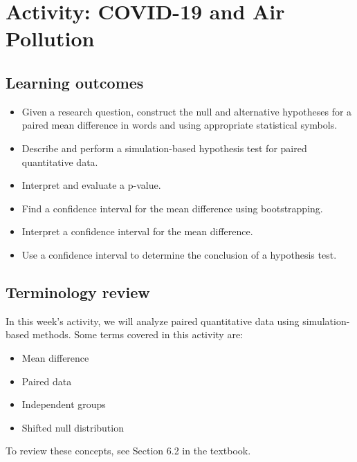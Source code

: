 \documentclass[
]{report}
\begin{document}
\newpage

\hypertarget{activity-covid-19-and-air-pollution}{%
\section{Activity: COVID-19 and Air Pollution}\label{activity-covid-19-and-air-pollution}}


\hypertarget{learning-outcomes-3}{%
\subsection{Learning outcomes}\label{learning-outcomes-3}}

\begin{itemize}
\item
  Given a research question, construct the null and alternative hypotheses for a paired mean difference
  in words and using appropriate statistical symbols.
\item
  Describe and perform a simulation-based hypothesis test for paired quantitative data.
\item
  Interpret and evaluate a p-value.
\item
  Find a confidence interval for the mean difference using bootstrapping.
\item
  Interpret a confidence interval for the mean difference.
\item
  Use a confidence interval to determine the conclusion of a hypothesis test.
\end{itemize}

\hypertarget{terminology-review-9}{%
\subsection{Terminology review}\label{terminology-review-9}}

In this week's activity, we will analyze paired quantitative data using simulation-based methods. Some terms covered in this activity are:

\begin{itemize}
\item
  Mean difference
\item
  Paired data
\item
  Independent groups
\item
  Shifted null distribution
\end{itemize}

To review these concepts, see Section 6.2 in the textbook.
\end{document}
